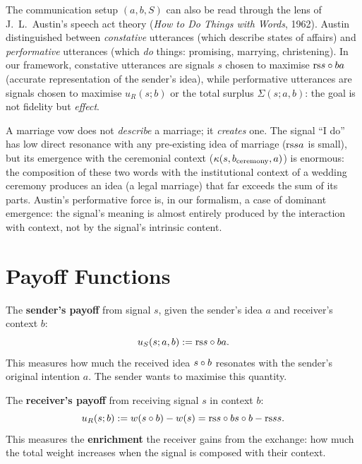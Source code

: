 \begin{remark}
\label{rem:ch13:setup_austin_performative}
The communication setup $(a, b, S)$ can also be read through the lens of
J.~L.~Austin's speech act theory (\emph{How to Do Things with Words},
1962).  Austin distinguished between \emph{constative} utterances (which
describe states of affairs) and \emph{performative} utterances (which
\emph{do} things: promising, marrying, christening).  In our framework,
constative utterances are signals $s$ chosen to maximise $\mathrm{rs}{s \circ b}{a}$
(accurate representation of the sender's idea), while performative
utterances are signals chosen to maximise $u_R(s; b)$ or the total surplus
$\Sigma(s; a, b)$: the goal is not fidelity but \emph{effect}.

A marriage vow does not \emph{describe} a marriage; it \emph{creates} one.
The signal ``I do'' has low direct resonance with any pre-existing idea of
marriage ($\mathrm{rs}{s}{a}$ is small), but its emergence with the ceremonial
context ($\kappa(s, b_{\mathrm{ceremony}}, a)$) is enormous: the
composition of these two words with the institutional context of a wedding
ceremony produces an idea (a legal marriage) that far exceeds the sum of its
parts.  Austin's performative force is, in our formalism, a case of
dominant emergence: the signal's meaning is almost entirely produced by
the interaction with context, not by the signal's intrinsic content.
\end{remark}





\section{Payoff Functions}

\begin{definition}
\label{def:sender-payoff}
The \textbf{sender's payoff} from signal $s$, given the sender's idea $a$ and
receiver's context $b$:
\[
  u_S(s; a, b) := \mathrm{rs}{s \circ b}{a}.
\]
This measures how much the received idea $s \circ b$ resonates with the
sender's original intention $a$.  The sender wants to maximise this quantity.
\end{definition}

\begin{definition}
\label{def:receiver-payoff}
The \textbf{receiver's payoff} from receiving signal $s$ in context $b$:
\[
  u_R(s; b) := w(s \circ b) - w(s) = \mathrm{rs}{s \circ b}{s \circ b} - \mathrm{rs}{s}{s}.
\]
This measures the \textbf{enrichment} the receiver gains from the exchange:
how much the total weight increases when the signal is composed with their
context.
\end{definition}

